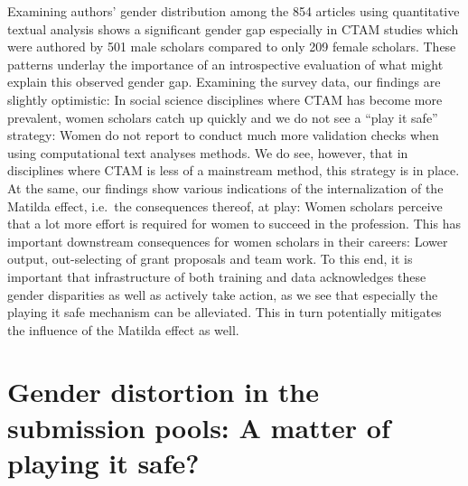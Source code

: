 \documentclass[
]{ccr}
\begin{document}
Examining authors' gender distribution among the 854 articles using
quantitative textual analysis shows a significant gender gap especially
in CTAM studies which were authored by 501 male scholars compared to
only 209 female scholars. These patterns underlay the importance of an
introspective evaluation of what might explain this observed gender gap.
Examining the survey data, our findings are slightly optimistic: In
social science disciplines where CTAM has become more prevalent, women
scholars catch up quickly and we do not see a ``play it safe'' strategy:
Women do not report to conduct much more validation checks when using
computational text analyses methods. We do see, however, that in
disciplines where CTAM is less of a mainstream method, this strategy is
in place. At the same, our findings show various indications of the
internalization of the Matilda effect, i.e.~the consequences thereof, at
play: Women scholars perceive that a lot more effort is required for
women to succeed in the profession. This has important downstream
consequences for women scholars in their careers: Lower output,
out-selecting of grant proposals and team work. To this end, it is
important that infrastructure of both training and data acknowledges
these gender disparities as well as actively take action, as we see that
especially the playing it safe mechanism can be alleviated. This in turn
potentially mitigates the influence of the Matilda effect as well.

\hypertarget{gender-distortion-in-the-submission-pools-a-matter-of-playing-it-safe}{%
\section{Gender distortion in the submission pools: A matter of playing
it
safe?}\label{gender-distortion-in-the-submission-pools-a-matter-of-playing-it-safe}}
\end{document}
